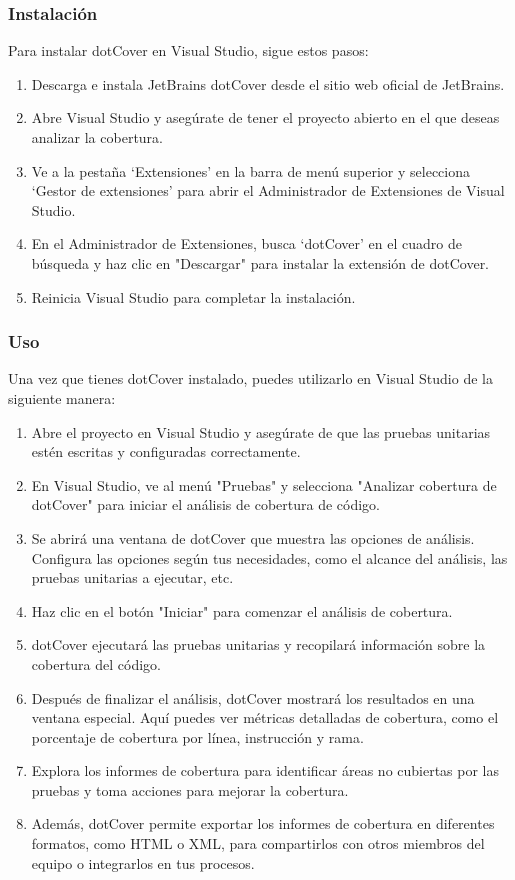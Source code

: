 \documentclass[executivepaper]{article}
\begin{document}
\subsubsection*{Instalación}

Para instalar dotCover en Visual Studio, sigue estos pasos:

\begin{enumerate}
  \item Descarga e instala JetBrains dotCover desde el sitio web oficial de JetBrains.
  \item Abre Visual Studio y asegúrate de tener el proyecto abierto en el que deseas analizar la cobertura.
  \item Ve a la pestaña \enquote*{Extensiones} en la barra de menú superior y selecciona \enquote*{Gestor de extensiones} para abrir el Administrador de Extensiones de Visual Studio.
  \item En el Administrador de Extensiones, busca \enquote*{dotCover} en el cuadro de búsqueda y haz clic en "Descargar" para instalar la extensión de dotCover.
  \item Reinicia Visual Studio para completar la instalación.
\end{enumerate}

\subsubsection*{Uso}

Una vez que tienes dotCover instalado, puedes utilizarlo en Visual Studio de la siguiente manera:

\begin{enumerate}
  \item Abre el proyecto en Visual Studio y asegúrate de que las pruebas unitarias estén escritas y configuradas correctamente.
  \item En Visual Studio, ve al menú "Pruebas" y selecciona "Analizar cobertura de dotCover" para iniciar el análisis de cobertura de código.
  \item Se abrirá una ventana de dotCover que muestra las opciones de análisis. Configura las opciones según tus necesidades, como el alcance del análisis, las pruebas unitarias a ejecutar, etc.
  \item Haz clic en el botón "Iniciar" para comenzar el análisis de cobertura.
  \item dotCover ejecutará las pruebas unitarias y recopilará información sobre la cobertura del código.
  \item Después de finalizar el análisis, dotCover mostrará los resultados en una ventana especial. Aquí puedes ver métricas detalladas de cobertura, como el porcentaje de cobertura por línea, instrucción y rama.
  \item Explora los informes de cobertura para identificar áreas no cubiertas por las pruebas y toma acciones para mejorar la cobertura.
  \item Además, dotCover permite exportar los informes de cobertura en diferentes formatos, como HTML o XML, para compartirlos con otros miembros del equipo o integrarlos en tus procesos.
\end{enumerate}
\end{document}
